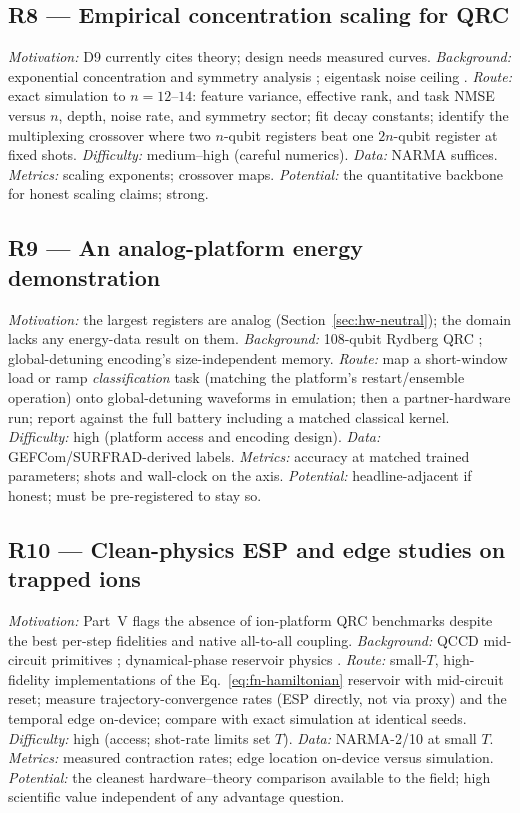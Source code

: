 \subsection*{R8 --- Empirical concentration scaling for QRC}
\emph{Motivation:} D9 currently cites theory; design needs measured
curves. \emph{Background:} exponential concentration and symmetry analysis
\citep{sannia2025exponential,xiong2025role}; eigentask noise ceiling
\citep{hu2023tackling}. \emph{Route:} exact simulation to $n=12$--$14$:
feature variance, effective rank, and task NMSE versus $n$, depth, noise
rate, and symmetry sector; fit decay constants; identify the multiplexing
crossover where two $n$-qubit registers beat one $2n$-qubit register at
fixed shots. \emph{Difficulty:} medium--high (careful numerics).
\emph{Data:} NARMA suffices. \emph{Metrics:} scaling exponents; crossover
maps. \emph{Potential:} the quantitative backbone for honest scaling
claims; strong.

\subsection*{R9 --- An analog-platform energy demonstration}
\emph{Motivation:} the largest registers are analog
(Section~\ref{sec:hw-neutral}); the domain lacks any energy-data result on
them. \emph{Background:} 108-qubit Rydberg QRC \citep{kornjaca2024large};
global-detuning encoding's size-independent memory.
\emph{Route:} map a short-window load or ramp \emph{classification} task
(matching the platform's restart/ensemble operation) onto global-detuning
waveforms in emulation; then a partner-hardware run; report against the
full battery including a matched classical kernel.
\emph{Difficulty:} high (platform access and encoding design).
\emph{Data:} GEFCom/SURFRAD-derived labels. \emph{Metrics:} accuracy at
matched trained parameters; shots and wall-clock on the axis.
\emph{Potential:} headline-adjacent if honest; must be pre-registered to
stay so.

\subsection*{R10 --- Clean-physics ESP and edge studies on trapped ions}
\emph{Motivation:} Part~V flags the absence of ion-platform QRC benchmarks
despite the best per-step fidelities and native all-to-all coupling.
\emph{Background:} QCCD mid-circuit primitives \citep{moses2023race};
dynamical-phase reservoir physics
\citep{martinez2021dynamical,kobayashi2026edge}. \emph{Route:} small-$T$,
high-fidelity implementations of the Eq.~\eqref{eq:fn-hamiltonian}
reservoir with mid-circuit reset; measure trajectory-convergence rates
(ESP directly, not via proxy) and the temporal edge on-device; compare with
exact simulation at identical seeds. \emph{Difficulty:} high (access;
shot-rate limits set $T$). \emph{Data:} NARMA-2/10 at small $T$.
\emph{Metrics:} measured contraction rates; edge location on-device versus
simulation. \emph{Potential:} the cleanest hardware--theory comparison
available to the field; high scientific value independent of any advantage
question.

